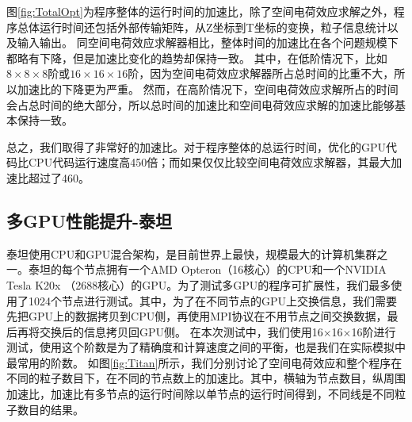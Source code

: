 图\ref{fig:TotalOpt}为程序整体的运行时间的加速比，除了空间电荷效应求解之外，程序总体运行时间还包括外部传输矩阵，从Z坐标到T坐标的变换，粒子信息统计以及输入输出。
同空间电荷效应求解器相比，整体时间的加速比在各个问题规模下都略有下降，但是加速比变化的趋势却保持一致。
其中，在低阶情况下，比如$8\times8\times8$阶或$16\times16\times16$阶，因为空间电荷效应求解器所占总时间的比重不大，所以加速比的下降更为严重。
然而，在高阶情况下，空间电荷效应求解所占的时间会占总时间的绝大部分，所以总时间的加速比和空间电荷效应求解的加速比能够基本保持一致。

总之，我们取得了非常好的加速比。对于程序整体的总运行时间，优化的GPU代码比CPU代码运行速度高450倍；而如果仅仅比较空间电荷效应求解器，其最大加速比超过了460。

\subsection{多GPU性能提升-泰坦}
泰坦使用CPU和GPU混合架构，是目前世界上最快，规模最大的计算机集群之一。泰坦的每个节点拥有一个AMD Opteron（16核心）的CPU和一个NVIDIA Tesla K20x （2688核心）的GPU。为了测试多GPU的程序可扩展性，我们最多使用了1024个节点进行测试。其中，为了在不同节点的GPU上交换信息，我们需要先把GPU上的数据拷贝到CPU侧，再使用MPI协议在不用节点之间交换数据，最后再将交换后的信息拷贝回GPU侧。
在本次测试中，我们使用16$\times$16$\times$16阶进行测试，使用这个阶数是为了精确度和计算速度之间的平衡，也是我们在实际模拟中最常用的阶数。
如图\ref{fig:Titan}所示，我们分别讨论了空间电荷效应和整个程序在不同的粒子数目下，在不同的节点数上的加速比。其中，横轴为节点数目，纵周围加速比，加速比有多节点的运行时间除以单节点的运行时间得到，不同线是不同粒子数目的结果。

